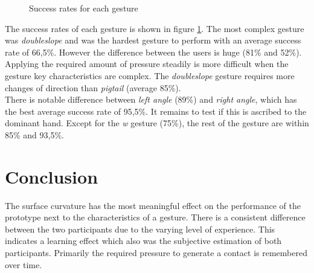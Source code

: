 \begin{center}
\begin{figure}
\caption{Success rates for each gesture}
\label{fig:gestures}
\end{figure}
\end{center}
The success rates of each gesture is shown in figure \ref{fig:gestures}. The most complex gesture was \emph{doubleslope} and was the hardest gesture to perform with an average success rate of 66,5\%. However the difference between the users is huge (81\% and 52\%). Applying the required amount of pressure steadily is more difficult when the gesture key characteristics are complex. The \emph{doubleslope} gesture requires more changes of direction than \emph{pigtail} (average 85\%).
\\
There is notable difference between \emph{left angle} (89\%) and \emph{right angle}, which has the best  average success rate of 95,5\%. It remains to test if this is ascribed to the dominant hand. Except for the \emph{w} gesture (75\%), the rest of the gesture are within 85\% and 93,5\%. 

\section{Conclusion}
The surface curvature has the most meaningful effect on the performance of the prototype next to the characteristics of a gesture. There is a consistent difference between the two participants due to the varying level of experience. This indicates a learning effect which also was the subjective estimation of both participants. Primarily the required pressure to generate a contact is remembered over time. 